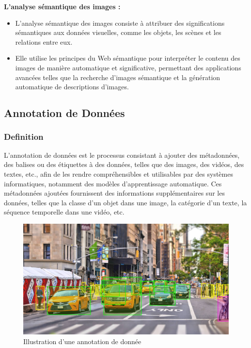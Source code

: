 \documentclass{article}
\begin{document}
	\textemdash \textbf{ L'analyse sémantique des images :}
	\begin{itemize}
		\item L'analyse sémantique des images consiste à attribuer des significations sémantiques aux données visuelles, comme les objets, les scènes et les relations entre eux.
		\item Elle utilise les principes du Web sémantique pour interpréter le contenu des images de manière automatique et significative, permettant des applications avancées telles que la recherche d'images sémantique et la génération automatique de descriptions d'images.
	\end{itemize}
	
	\subsection{Annotation de Données}
	\subsubsection{Definition}
	L'annotation de données est le processus consistant à ajouter des métadonnées, des balises ou des étiquettes à des données, telles que des images, des vidéos, des textes, etc., afin de les rendre compréhensibles et utilisables par des systèmes informatiques, notamment des modèles d'apprentissage automatique. Ces métadonnées ajoutées fournissent des informations supplémentaires sur les données, telles que la classe d'un objet dans une image, la catégorie d'un texte, la séquence temporelle dans une vidéo, etc.
	
	
	\begin{figure}[htbp]
		\begin{center}
			\begin{minipage}[b]{0.7\textwidth}
				\centering
				\includegraphics[width=\textwidth]{img/13.jpeg}
				\caption{Illustration d'une annotation de donnée}
			\end{minipage}
		\end{center}
	\end{figure}
	
\end{document}
